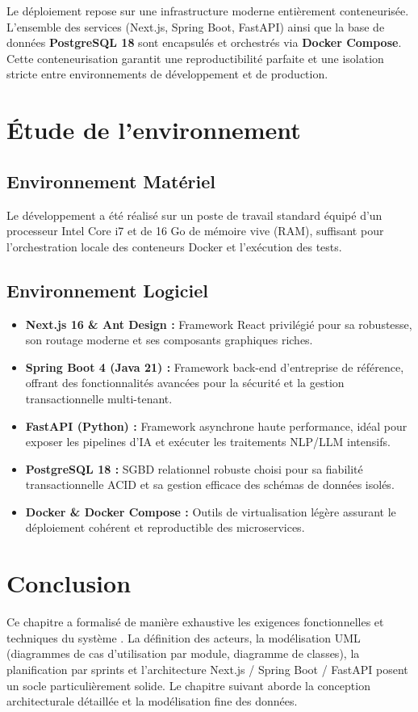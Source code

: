 Le déploiement repose sur une infrastructure moderne entièrement conteneurisée. L'ensemble des services (Next.js, Spring Boot, FastAPI) ainsi que la base de données \textbf{PostgreSQL 18} sont encapsulés et orchestrés via \textbf{Docker Compose}. Cette conteneurisation garantit une reproductibilité parfaite et une isolation stricte entre environnements de développement et de production.

\section{Étude de l'environnement}

\subsection{Environnement Matériel}

Le développement a été réalisé sur un poste de travail standard équipé d'un processeur Intel Core i7 et de 16 Go de mémoire vive (RAM), suffisant pour l'orchestration locale des conteneurs Docker et l'exécution des tests.

\subsection{Environnement Logiciel}

\begin{itemize}
    \item \textbf{Next.js 16 \& Ant Design :} Framework React privilégié pour sa robustesse, son routage moderne et ses composants graphiques riches.
    \item \textbf{Spring Boot 4 (Java 21) :} Framework back-end d'entreprise de référence, offrant des fonctionnalités avancées pour la sécurité et la gestion transactionnelle multi-tenant.
    \item \textbf{FastAPI (Python) :} Framework asynchrone haute performance, idéal pour exposer les pipelines d'IA et exécuter les traitements NLP/LLM intensifs.
    \item \textbf{PostgreSQL 18 :} SGBD relationnel robuste choisi pour sa fiabilité transactionnelle ACID et sa gestion efficace des schémas de données isolés.
    \item \textbf{Docker \& Docker Compose :} Outils de virtualisation légère assurant le déploiement cohérent et reproductible des microservices.
\end{itemize}

\clearpage
\section{Conclusion}

Ce chapitre a formalisé de manière exhaustive les exigences fonctionnelles et techniques du système \projectShortTitle. La définition des acteurs, la modélisation UML (diagrammes de cas d'utilisation par module, diagramme de classes), la planification par sprints et l'architecture Next.js / Spring Boot / FastAPI posent un socle particulièrement solide. Le chapitre suivant aborde la conception architecturale détaillée et la modélisation fine des données.
